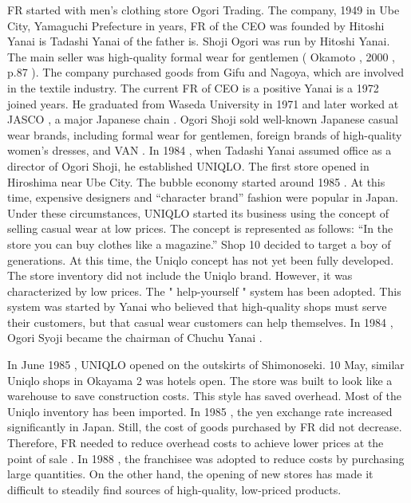 \documentclass[12pt,]{article}
\begin{document}
FR started with men's clothing store Ogori Trading. The company, 1949 in
Ube City, Yamaguchi Prefecture in years, FR of the CEO was founded by
Hitoshi Yanai is Tadashi Yanai of the father is. Shoji Ogori was run by
Hitoshi Yanai. The main seller was high-quality formal wear for
gentlemen ( Okamoto , 2000 , p.87 ). The company purchased goods from
Gifu and Nagoya, which are involved in the textile industry. The current
FR of CEO is a positive Yanai is a 1972 joined years. He graduated from
Waseda University in 1971 and later worked at JASCO , a major Japanese
chain . Ogori Shoji sold well-known Japanese casual wear brands,
including formal wear for gentlemen, foreign brands of high-quality
women's dresses, and VAN . In 1984 , when Tadashi Yanai assumed office
as a director of Ogori Shoji, he established UNIQLO. The first store
opened in Hiroshima near Ube City. The bubble economy started around
1985 . At this time, expensive designers and ``character brand'' fashion
were popular in Japan. Under these circumstances, UNIQLO started its
business using the concept of selling casual wear at low prices. The
concept is represented as follows: ``In the store you can buy clothes
like a magazine.'' Shop 10 decided to target a boy of generations. At
this time, the Uniqlo concept has not yet been fully developed. The
store inventory did not include the Uniqlo brand. However, it was
characterized by low prices. The " help-yourself " system has been
adopted. This system was started by Yanai who believed that high-quality
shops must serve their customers, but that casual wear customers can
help themselves. In 1984 , Ogori Syoji became the chairman of Chuchu
Yanai .

In June 1985 , UNIQLO opened on the outskirts of Shimonoseki. 10 May,
similar Uniqlo shops in Okayama 2 was hotels open. The store was built
to look like a warehouse to save construction costs. This style has
saved overhead. Most of the Uniqlo inventory has been imported. In 1985
, the yen exchange rate increased significantly in Japan. Still, the
cost of goods purchased by FR did not decrease. Therefore, FR needed to
reduce overhead costs to achieve lower prices at the point of sale . In
1988 , the franchisee was adopted to reduce costs by purchasing large
quantities. On the other hand, the opening of new stores has made it
difficult to steadily find sources of high-quality, low-priced products.
\end{document}
